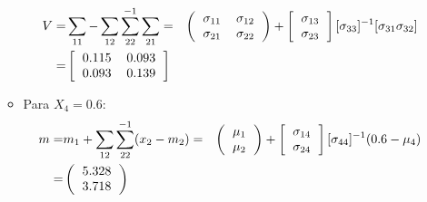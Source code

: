 \documentclass[11pt,a4paper]{book}
\begin{document}
\begin{enumerate}
\begin{itemize}
		\begin{eqnarray*}
			V =& \sum_{11}-\sum_{12}\sum_{22}^{-1}\sum_{21}
			=&\left(
			\begin{tabular}{c c}
			$\sigma_{11}$ & $\sigma_{12}$\\
			$\sigma_{21}$ & $\sigma_{22}$\\
			\end{tabular}
			\right)+
			\left[
			\begin{tabular}{c}
			$\sigma_{13}$\\
			$\sigma_{23}$\\
			\end{tabular}
			\right][\sigma_{33}]^{-1}[\sigma_{31} \sigma_{32}]\\
			=&\left[
			\begin{tabular}{c c}
				0.115 & 0.093\\
				0.093 & 0.139\\
			\end{tabular}
			\right]
		\end{eqnarray*}
		
		\item
		Para $X_4=0.6$:
		\begin{eqnarray*}
			m =& m_1+\sum_{12}\sum_{22}^{-1}(x_2-m_2)
			=&\left(
			\begin{tabular}{c}
			$\mu_1$\\
			$\mu_2$\\
			\end{tabular}
			\right)+
			\left[
			\begin{tabular}{c}
			$\sigma_{14}$\\
			$\sigma_{24}$\\
			\end{tabular}
			\right][\sigma_{44}]^{-1}(0.6-\mu_4)\\
			=&\left(
			\begin{tabular}{c}
				5.328\\
				3.718\\
			\end{tabular}
			\right)
		\end{eqnarray*}
		

\end{itemize}
\end{enumerate}
\end{document}
